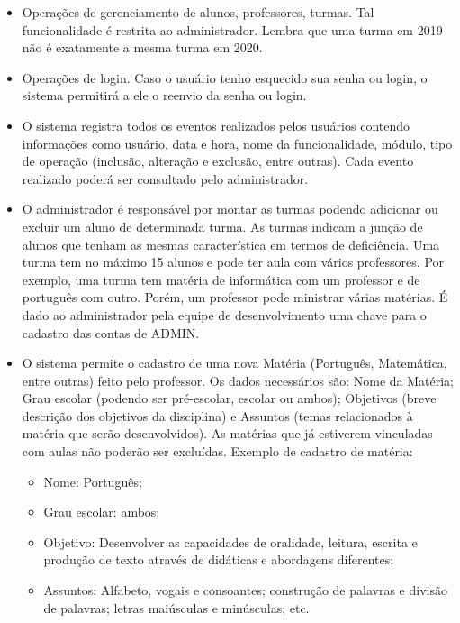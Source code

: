 \documentclass{utfpr-pg}
\begin{document}
  
\begin{itemize}
    \item Operações de gerenciamento de alunos, professores, turmas. Tal funcionalidade é restrita ao administrador. Lembra que uma turma em 2019 não é exatamente a mesma turma em 2020.
    
    \item Operações de login. Caso o usuário tenho esquecido sua senha ou login, o sistema permitirá a ele o reenvio da senha ou login.
   
    \item O sistema registra todos os eventos realizados pelos usuários contendo informações como usuário, data e hora, nome da funcionalidade, módulo, tipo de operação (inclusão, alteração e exclusão, entre outras). Cada evento realizado poderá ser consultado pelo administrador.
   
    \item O administrador é responsável por montar as turmas podendo adicionar ou excluir um aluno de determinada turma. As turmas indicam a junção de alunos que tenham as mesmas característica em termos de deficiência. Uma turma tem no máximo 15 alunos e pode ter aula com vários professores. Por exemplo, uma turma tem matéria de informática com um professor e de português com outro. Porém, um professor pode ministrar várias matérias. É dado ao administrador pela equipe de desenvolvimento uma chave para o cadastro das contas de ADMIN.
  
    \item O sistema permite o cadastro de uma nova Matéria (Português, Matemática, entre outras) feito pelo professor.  Os dados necessários são: Nome da Matéria; Grau escolar (podendo ser pré-escolar, escolar ou ambos); Objetivos (breve descrição dos objetivos da disciplina) e Assuntos (temas relacionados à matéria que serão desenvolvidos). As matérias que já estiverem vinculadas com aulas não poderão ser excluídas. Exemplo de cadastro de matéria: 
    
    \begin{itemize}
    \item Nome: Português;
    \item Grau escolar: ambos; 
    \item Objetivo: Desenvolver as capacidades de oralidade, leitura, escrita e produção de texto através de didáticas e abordagens diferentes; 
    \item Assuntos: Alfabeto, vogais e consoantes; construção de palavras e divisão de palavras; letras maiúsculas e minúsculas; etc.
    \end{itemize}
    

\end{itemize}
\end{document}
